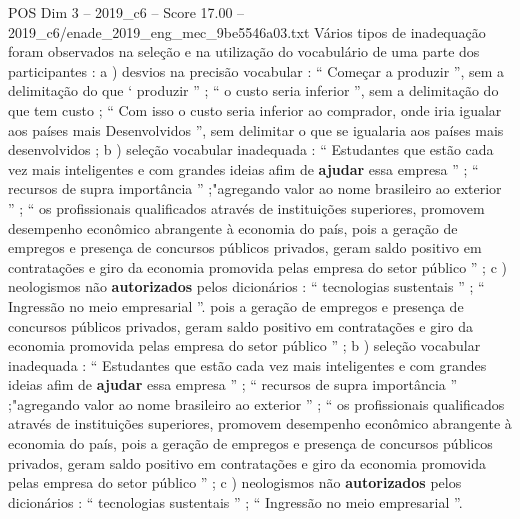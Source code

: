 \begin{textsample}{POS Dim 3 – 2019\_c6 – Score 17.00 – 2019\_c6/enade\_2019\_eng\_mec\_9be5546a03.txt}
Vários tipos de inadequação foram observados na seleção e na utilização do vocabulário de uma parte dos participantes : a ) desvios na precisão vocabular : “ Começar a produzir ”, sem a delimitação do que ‘ produzir ” ; “ o custo seria inferior ”, sem a delimitação do que tem custo ; “ Com isso o custo seria inferior ao comprador, onde iria igualar aos países mais Desenvolvidos ”, sem delimitar o que se igualaria aos países mais desenvolvidos ; b ) seleção vocabular inadequada : “ Estudantes que estão cada vez mais inteligentes e com grandes ideias afim de \textbf{ajudar} essa empresa ” ; “ recursos de supra importância ” ;"agregando valor ao nome brasileiro ao exterior ” ; “ os profissionais qualificados através de instituições superiores, promovem desempenho econômico abrangente à economia do país, pois a geração de empregos e presença de concursos públicos privados, geram saldo positivo em contratações e giro da economia promovida pelas empresa do setor público ” ; c ) neologismos não \textbf{autorizados} pelos dicionários : “ tecnologias sustentais ” ; “ Ingressão no meio empresarial ”. pois a geração de empregos e presença de concursos públicos privados, geram saldo positivo em contratações e giro da economia promovida pelas empresa do setor público ” ; b ) seleção vocabular inadequada : “ Estudantes que estão cada vez mais inteligentes e com grandes ideias afim de \textbf{ajudar} essa empresa ” ; “ recursos de supra importância ” ;"agregando valor ao nome brasileiro ao exterior ” ; “ os profissionais qualificados através de instituições superiores, promovem desempenho econômico abrangente à economia do país, pois a geração de empregos e presença de concursos públicos privados, geram saldo positivo em contratações e giro da economia promovida pelas empresa do setor público ” ; c ) neologismos não \textbf{autorizados} pelos dicionários : “ tecnologias sustentais ” ; “ Ingressão no meio empresarial ”.

\end{textsample}
